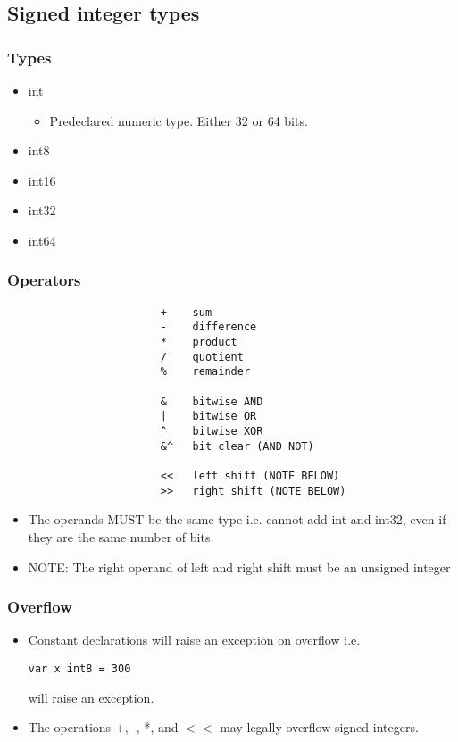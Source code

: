 \documentclass{article}
\begin{document}
			
    	\subsection{Signed integer types}
			\subsubsection{Types}
			\begin{itemize}
    				\item int
					\begin{itemize}
						\item Predeclared numeric type. Either 32 or 64 bits. 
					\end{itemize}
    				\item int8
    				\item int16
   	 			\item int32
  	  			\item int64
			\end{itemize}
			\subsubsection{Operators}
				\begin{verbatim}
					    +    sum  
					    -    difference   
					    *    product       
					    /    quotient     
					    %    remainder  

					    &    bitwise AND    
					    |    bitwise OR    
					    ^    bitwise XOR   
					    &^   bit clear (AND NOT) 

					    <<   left shift (NOTE BELOW)
					    >>   right shift (NOTE BELOW)
				\end{verbatim}	
				\begin{itemize}
					\item The operands MUST be the same type i.e. cannot add int and int32, even if they are the same number of bits.  
					\item NOTE: The right operand of left and right shift must be an unsigned integer
				\end{itemize}
			\subsubsection{Overflow}
				\begin{itemize}
					\item Constant declarations will raise an exception on overflow i.e. \begin{verbatim}var x int8 = 300\end{verbatim} will raise an exception.
					\item The operations +, -, *, and \(<<\) may legally overflow signed integers. 
				\end{itemize}
\end{document}

